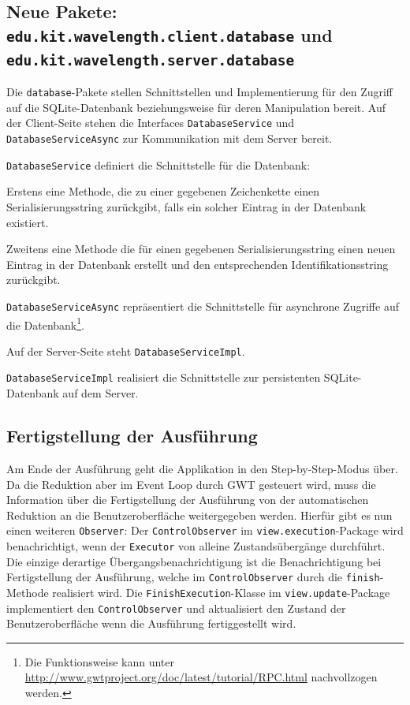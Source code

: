 \documentclass[parskip=full,11pt]{scrartcl}
\begin{document}
\subsection[Hinzugefügte Pakete]{Neue Pakete: \texttt{edu.kit.wavelength.client.database} und \texttt{edu.kit.wavelength.server.database}}

Die \texttt{database}-Pakete stellen Schnittstellen und Implementierung für den Zugriff auf die SQLite-Datenbank beziehungsweise für deren Manipulation bereit.
Auf der Client-Seite stehen die Interfaces \texttt{DatabaseService} und \texttt{DatabaseServiceAsync} zur Kommunikation mit dem Server bereit.

\texttt{DatabaseService} definiert die Schnittstelle für die Datenbank:

Erstens eine Methode, die zu einer gegebenen Zeichenkette einen Serialisierungsstring zurückgibt,
falls ein solcher Eintrag in der Datenbank existiert.

Zweitens eine Methode die für einen gegebenen Serialisierungsstring einen neuen Eintrag in der Datenbank erstellt und den entsprechenden Identifikationsstring zurückgibt.

\texttt{DatabaseServiceAsync} repräsentiert die Schnittstelle für asynchrone Zugriffe auf die Datenbank\footnote{Die Funktionsweise kann unter \href{http://www.gwtproject.org/doc/latest/tutorial/RPC.html}{http://www.gwtproject.org/doc/latest/tutorial/RPC.html} nachvollzogen werden.}.

Auf der Server-Seite steht \texttt{DatabaseServiceImpl}.

\texttt{DatabaseServiceImpl} realisiert die Schnittstelle zur persistenten SQLite-Datenbank auf dem Server.
\subsection{Fertigstellung der Ausführung}
Am Ende der Ausführung geht die Applikation in den Step-by-Step-Modus über. Da die Reduktion aber im Event Loop durch GWT gesteuert wird, muss die Information über die Fertigstellung der Ausführung von der automatischen Reduktion an die Benutzeroberfläche weitergegeben werden.
Hierfür gibt es nun einen weiteren \texttt{Observer}: Der \texttt{ControlObserver} im \texttt{view.execution}-Package wird benachrichtigt, wenn der \texttt{Executor} von alleine Zustandsübergänge durchführt.
Die einzige derartige Übergangsbenachrichtigung ist die Benachrichtigung bei Fertigstellung der Ausführung, welche im \texttt{ControlObserver} durch die \texttt{finish}-Methode realisiert wird.
Die \texttt{FinishExecution}-Klasse im \texttt{view.update}-Package implementiert den \texttt{ControlObserver} und aktualisiert den Zustand der Benutzeroberfläche wenn die Ausführung fertiggestellt wird.
\end{document}
